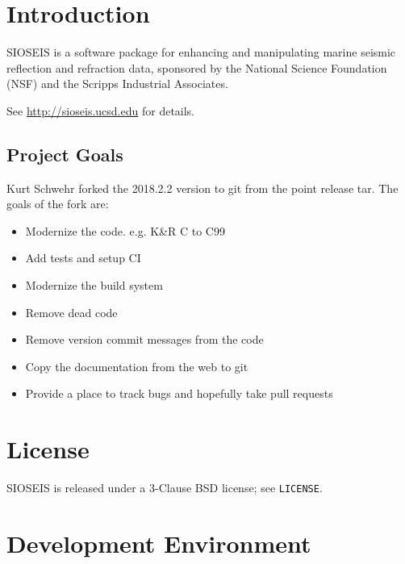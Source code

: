 \chapter{Introduction}

SIOSEIS is a software package for enhancing and manipulating marine
seismic reflection and refraction data, sponsored by the National 
Science Foundation (NSF) and the Scripps Industrial Associates.

See \url{http://sioseis.ucsd.edu} for details.

\section{Project Goals}

Kurt Schwehr forked the 2018.2.2 version to git from the
point release tar.  The goals of the fork are:

\begin{itemize}
\item Modernize the code.  e.g. K\&R C to C99
\item Add tests and setup CI
\item Modernize the build system
\item Remove dead code
\item Remove version commit messages from the code
\item Copy the documentation from the web to git
\item Provide a place to track bugs and hopefully take pull requests
\end{itemize}

\chapter{License}

SIOSEIS is released under a 3-Clause BSD license; see \texttt{LICENSE}.

\chapter{Development Environment}

